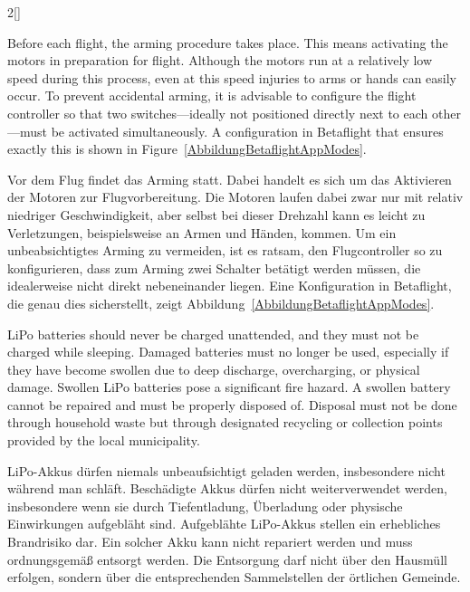 \begin{paracol}{2}[]
\renewcommand{\deutschertitel}{Sicherheit vor dem Flug}
\renewcommand{\englischertitel}{Security before Flight}
\makroabschnitt
\label{AbschnittSicherheitVorFlug}

Before each flight, the arming procedure takes place. This means activating the motors in preparation for flight. Although the motors run at a relatively low speed during this process, even at this speed injuries to arms or hands can easily occur. To prevent accidental arming, it is advisable to configure the flight controller so that two switches—ideally not positioned directly next to each other—must be activated simultaneously. A configuration in Betaflight that ensures exactly this is shown in Figure~\ref{AbbildungBetaflightAppModes}.

\colger

Vor dem Flug findet das Arming statt. Dabei handelt es sich um das Aktivieren der Motoren zur Flugvorbereitung. Die Motoren laufen dabei zwar nur mit relativ niedriger Geschwindigkeit, aber selbst bei dieser Drehzahl kann es leicht zu Verletzungen, beispielsweise an Armen und Händen, kommen. Um ein unbeabsichtigtes Arming zu vermeiden, ist es ratsam, den Flugcontroller so zu konfigurieren, dass zum Arming zwei Schalter betätigt werden müssen, die idealerweise nicht direkt nebeneinander liegen. Eine Konfiguration in Betaflight, die genau dies sicherstellt, zeigt Abbildung~\ref{AbbildungBetaflightAppModes}.

\colende

\renewcommand{\deutschertitel}{Sichere Verwendung von LiPo-Akkus}
\renewcommand{\englischertitel}{Secure use of LiPo Batteries}
\makroabschnitt
\label{AbschnittSicherheitLiPoAkkus}

LiPo batteries should never be charged unattended, and they must not be charged while sleeping. Damaged batteries must no longer be used, especially if they have become swollen due to deep discharge, overcharging, or physical damage. Swollen LiPo batteries pose a significant fire hazard. A swollen battery cannot be repaired and must be properly disposed of. Disposal must not be done through household waste but through designated recycling or collection points provided by the local municipality.

\colger

LiPo-Akkus dürfen niemals unbeaufsichtigt geladen werden, insbesondere nicht während man schläft. Beschädigte Akkus dürfen nicht weiterverwendet werden, insbesondere wenn sie durch Tiefentladung, Überladung oder physische Einwirkungen aufgebläht sind. Aufgeblähte LiPo-Akkus stellen ein erhebliches Brandrisiko dar. Ein solcher Akku kann nicht repariert werden und muss ordnungsgemäß entsorgt werden. Die Entsorgung darf nicht über den Hausmüll erfolgen, sondern über die entsprechenden Sammelstellen der örtlichen Gemeinde.


\end{paracol}
